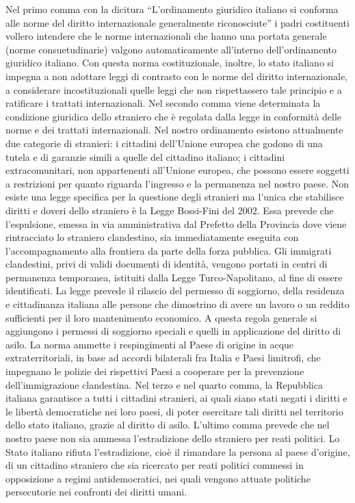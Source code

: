 \documentclass{report}
\begin{document}
Nel primo comma con la dicitura “L'ordinamento giuridico italiano si conforma alle norme del diritto
internazionale generalmente riconosciute” i padri costituenti vollero intendere che le norme internazionali che hanno
una portata generale (norme consuetudinarie) valgono automaticamente all’interno dell’ordinamento
giuridico italiano. Con questa norma costituzionale, inoltre, lo stato italiano si impegna a non adottare leggi di contrasto
con le norme del diritto internazionale, a considerare incostituzionali quelle leggi che non rispettassero tale principio e a
ratificare i trattati internazionali.
Nel secondo comma viene determinata la condizione giuridica dello straniero che è regolata dalla legge in conformità
delle norme e dei trattati internazionali.
Nel nostro ordinamento esistono attualmente due categorie di stranieri: i cittadini dell'Unione europea che godono di
una tutela e di garanzie simili a quelle del cittadino italiano; i cittadini extracomunitari, non appartenenti
all'Unione europea, che possono essere soggetti a restrizioni per quanto riguarda l'ingresso e la permanenza nel nostro
paese.
Non esiste una legge specifica per la questione degli stranieri ma l’unica che stabilisce diritti e doveri dello straniero è
la Legge Bossi-Fini del 2002. Essa prevede che l'espulsione, emessa in via amministrativa dal Prefetto della Provincia
dove viene rintracciato lo straniero clandestino, sia immediatamente eseguita con l'accompagnamento alla
frontiera da parte della forza pubblica. Gli immigrati clandestini, privi di validi documenti di identità, vengono
portati in centri di permanenza temporanea, istituiti dalla Legge Turco-Napolitano, al fine di essere identificati.
La legge prevede il rilascio del permesso di soggiorno, della residenza e cittadinanza italiana alle persone che
dimostrino di avere un lavoro o un reddito sufficienti per il loro mantenimento economico. A questa regola generale si
aggiungono i permessi di soggiorno speciali e quelli in applicazione del diritto di asilo. La norma ammette i
respingimenti al Paese di origine in acque extraterritoriali, in base ad accordi bilaterali fra Italia e Paesi limitrofi,
che impegnano le polizie dei rispettivi Paesi a cooperare per la prevenzione dell'immigrazione clandestina.
Nel terzo e nel quarto comma, la Repubblica italiana garantisce a tutti i cittadini stranieri, ai quali siano stati negati i
diritti e le libertà democratiche nei loro paesi, di poter esercitare tali diritti nel territorio dello stato italiano, grazie al
diritto di asilo.
L'ultimo comma prevede che nel nostro paese non sia ammessa l'estradizione dello straniero per reati politici. Lo Stato
italiano rifiuta l'estradizione, cioè il rimandare la persona al paese d’origine, di un cittadino straniero che sia ricercato
per reati politici commessi in opposizione a regimi antidemocratici, nei quali vengono attuate politiche
persecutorie nei confronti dei diritti umani.
\end{document}
